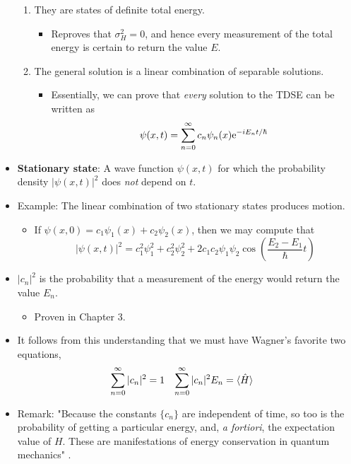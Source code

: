 \documentclass[../notes.tex]{subfiles}
\begin{document}
\begin{itemize}
\begin{enumerate}
        \item They are states of definite total energy.
        \begin{itemize}
            \item Reproves that $\sigma_H^2=0$, and hence every measurement of the total energy is certain to return the value $E$.
        \end{itemize}
        \item The general solution is a linear combination of separable solutions.
        \begin{itemize}
            \item Essentially, we can prove that \emph{every} solution to the TDSE can be written as
            \begin{equation*}
                \psi(x,t) = \sum_{n=0}^\infty c_n\psi_n(x)\e[-iE_nt/\hbar]
            \end{equation*}
        \end{itemize}
    \end{enumerate}
    \item \textbf{Stationary state}: A wave function $\psi(x,t)$ for which the probability density $|\psi(x,t)|^2$ does \emph{not} depend on $t$.
    \item Example: The linear combination of two stationary states produces motion.
    \begin{itemize}
        \item If $\psi(x,0)=c_1\psi_1(x)+c_2\psi_2(x)$, then we may compute that
        \begin{equation*}
            |\psi(x,t)|^2 = c_1^2\psi_1^2+c_2^2\psi_2^2+2c_1c_2\psi_1\psi_2\cos(\frac{E_2-E_1}{\hbar}t)
        \end{equation*}
    \end{itemize}
    \item $|c_n|^2$ is the probability that a measurement of the energy would return the value $E_n$.
    \begin{itemize}
        \item Proven in Chapter 3.
    \end{itemize}
    \item It follows from this understanding that we must have Wagner's favorite two equations,
    \begin{align*}
        \sum_{n=0}^\infty|c_n|^2 &= 1&
        \sum_{n=0}^\infty|c_n|^2E_n &= \Exp{\hat{H}}
    \end{align*}
    \item Remark: "Because the constants $\{c_n\}$ are independent of time, so too is the probability of getting a particular energy, and, \emph{a fortiori}, the expectation value of $H$. These are manifestations of energy conservation in quantum mechanics" \parencite[47]{bib:Griffiths}.
\end{itemize}
\end{document}
